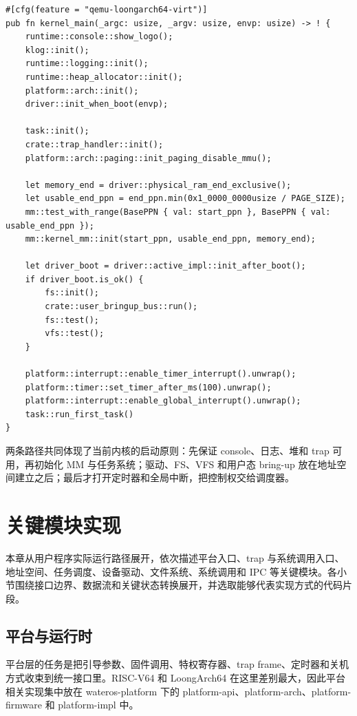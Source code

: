 \documentclass[12pt,openany,oneside,AutoFakeBold=true]{ctexbook}
\newcommand{\code}[1]{\textnormal{\rmfamily #1}}
\begin{document}
\begin{lstlisting}
#[cfg(feature = "qemu-loongarch64-virt")]
pub fn kernel_main(_argc: usize, _argv: usize, envp: usize) -> ! {
    runtime::console::show_logo();
    klog::init();
    runtime::logging::init();
    runtime::heap_allocator::init();
    platform::arch::init();
    driver::init_when_boot(envp);

    task::init();
    crate::trap_handler::init();
    platform::arch::paging::init_paging_disable_mmu();

    let memory_end = driver::physical_ram_end_exclusive();
    let usable_end_ppn = end_ppn.min(0x1_0000_0000usize / PAGE_SIZE);
    mm::test_with_range(BasePPN { val: start_ppn }, BasePPN { val: usable_end_ppn });
    mm::kernel_mm::init(start_ppn, usable_end_ppn, memory_end);

    let driver_boot = driver::active_impl::init_after_boot();
    if driver_boot.is_ok() {
        fs::init();
        crate::user_bringup_bus::run();
        fs::test();
        vfs::test();
    }

    platform::interrupt::enable_timer_interrupt().unwrap();
    platform::timer::set_timer_after_ms(100).unwrap();
    platform::interrupt::enable_global_interrupt().unwrap();
    task::run_first_task()
}
\end{lstlisting}

两条路径共同体现了当前内核的启动原则：先保证 console、日志、堆和 trap 可用，再初始化 MM 与任务系统；驱动、FS、VFS 和用户态 bring-up 放在地址空间建立之后；最后才打开定时器和全局中断，把控制权交给调度器。

\chapter{关键模块实现}

本章从用户程序实际运行路径展开，依次描述平台入口、trap 与系统调用入口、地址空间、任务调度、设备驱动、文件系统、系统调用和 IPC 等关键模块。各小节围绕接口边界、数据流和关键状态转换展开，并选取能够代表实现方式的代码片段。


\section{平台与运行时}

平台层的任务是把引导参数、固件调用、特权寄存器、trap frame、定时器和关机方式收束到统一接口里。RISC-V64 和 LoongArch64 在这里差别最大，因此平台相关实现集中放在 \code{wateros-platform} 下的 \code{platform-api}、\code{platform-arch}、\code{platform-firmware} 和 \code{platform-impl} 中。
\end{document}
